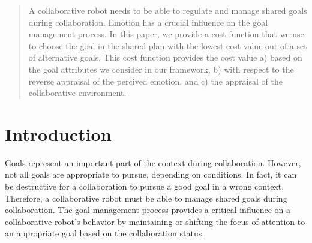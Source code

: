 \documentclass[conference]{IEEEtran}
\begin{document}




\maketitle

\begin{abstract}
A collaborative robot needs to be able to regulate and manage shared goals
during collaboration. Emotion has a crucial influence on the goal management
process. In this paper, we provide a cost function that we use to choose the
goal in the shared plan with the lowest cost value out of a set of alternative
goals. This cost function provides the cost value a) based on the goal
attributes we consider in our framework, b) with respect to the reverse
appraisal of the percived emotion, and c) the appraisal of the collaborative
environment.
\end{abstract}





%
\IEEEpeerreviewmaketitle

\vspace*{-2mm}
\section{Introduction}


Goals represent an important part of the context during collaboration. However,
not all goals are appropriate to pursue, depending on conditions. In fact, it
can be destructive for a collaboration to pursue a good goal in a wrong context.
Therefore, a collaborative robot must be able to manage shared goals during
collaboration. The goal management process provides a critical influence on a
collaborative robot's behavior by maintaining or shifting the focus of attention
to an appropriate goal based on the collaboration status.
\end{document}
